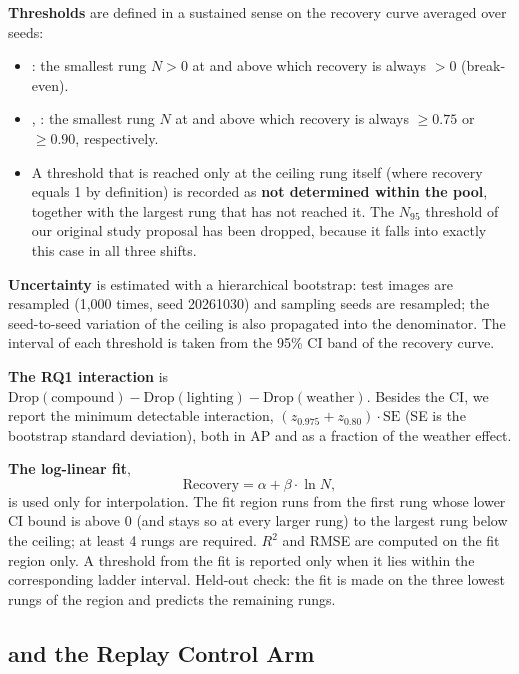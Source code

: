 \textbf{Thresholds} are defined in a sustained sense on the recovery curve averaged over seeds:
\begin{itemize}
\item \NBE: the smallest rung $N > 0$ at and above which recovery is always $> 0$ (break-even).
\item \Nsf, \Nnf: the smallest rung $N$ at and above which recovery is always $\geq 0.75$ or $\geq 0.90$, respectively.
\item A threshold that is reached only at the ceiling rung itself (where recovery equals 1 by definition) is recorded as \textbf{not determined within the pool}, together with the largest rung that has not reached it. The $N_{95}$ threshold of our original study proposal has been dropped, because it falls into exactly this case in all three shifts.
\end{itemize}

\textbf{Uncertainty} is estimated with a hierarchical bootstrap: test images are resampled (1,000 times, seed 20261030) and sampling seeds are resampled; the seed-to-seed variation of the ceiling is also propagated into the denominator. The interval of each threshold is taken from the 95\% CI band of the recovery curve.

\textbf{The RQ1 interaction} is $\mathrm{Drop}(\text{compound}) - \mathrm{Drop}(\text{lighting}) - \mathrm{Drop}(\text{weather})$. Besides the CI, we report the minimum detectable interaction, $(z_{0.975} + z_{0.80})\cdot\mathrm{SE}$ (SE is the bootstrap standard deviation), both in AP and as a fraction of the weather effect.

\textbf{The log-linear fit},
\begin{equation}
\mathrm{Recovery} = \alpha + \beta\cdot\ln N,
\label{eq:fit}
\end{equation}
is used only for interpolation. The fit region runs from the first rung whose lower CI bound is above 0 (and stays so at every larger rung) to the largest rung below the ceiling; at least 4 rungs are required. $R^2$ and RMSE are computed on the fit region only. A threshold from the fit is reported only when it lies within the corresponding ladder interval. Held-out check: the fit is made on the three lowest rungs of the region and predicts the remaining rungs.

\subsection{\texorpdfstring{\aldi}{ALDI++} and the Replay Control Arm}\label{sec:aldi}

